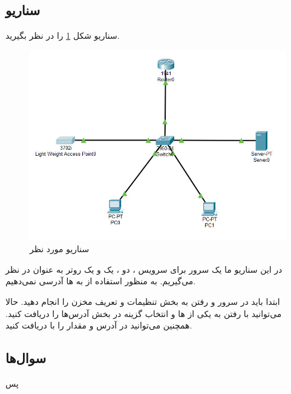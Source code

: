 \documentclass[12pt]{article}
\begin{document}
\subsection{سناریو}
سناریو شکل \ref{fig:scenario} را در نظر بگیرید.
\begin{figure}[h!]
	\centering
	\includegraphics[width=0.5\columnwidth]{figs/s-1.jpg}
	\caption{سناریو مورد نظر}
	\label{fig:scenario}
\end{figure}
در این سناریو ما یک سرور برای سرویس ، دو ، یک
و یک روتر به عنوان  در نظر می‌گیریم.
به منظور استفاده از  به ها آدرسی نمی‌دهیم. 

ابتدا باید در سرور و رفتن به بخش  تنظیمات  و تعریف مخزن 
را انجام دهید. 
حالا می‌توانید با رفتن به یکی از ها و انتخاب گزینه  در بخش
آدرس‌ها را دریافت کنید. همچنین می‌توانید در  آدرس و مقدار  را با  دریافت کنید.

\subsection{سوال‌ها}
پس
\end{document}
